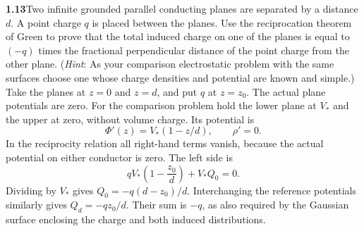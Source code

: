 \par\bigskip
\noindent\textbf{1.13}\quad Two infinite grounded parallel conducting planes are separated by a distance $d$. A point charge $q$ is placed between the planes. Use the reciprocation theorem of Green to prove that the total induced charge on one of the planes is equal to $(-q)$ times the fractional perpendicular distance of the point charge from the other plane. (\emph{Hint}: As your comparison electrostatic problem with the same surfaces choose one whose charge densities and potential are known and simple.)
\solution
Take the planes at $z=0$ and $z=d$, and put $q$ at $z=z_0$.
The actual plane potentials are zero. For the comparison problem hold the
lower plane at $V_*$ and the upper at zero, without volume charge. Its potential is
\[
\Phi'(z)=V_*(1-z/d),\qquad\rho'=0.
\]
In the reciprocity relation all right-hand terms vanish, because the actual
potential on either conductor is zero. The left side is
\[
qV_*\left(1-\frac{z_0}{d}\right)+V_*Q_0=0.
\]
Dividing by $V_*$ gives
$\boxed{Q_0=-q(d-z_0)/d}$.
Interchanging the reference potentials similarly gives
$\boxed{Q_d=-qz_0/d}$. Their sum is $-q$, as also required by the Gaussian
surface enclosing the charge and both induced distributions.


